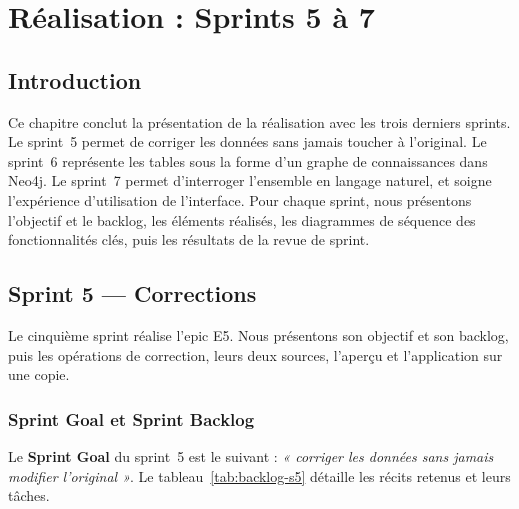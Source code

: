 \chapter{Réalisation : Sprints 5 à 7}

\section*{Introduction}
Ce chapitre conclut la présentation de la réalisation avec les trois derniers sprints. Le sprint~5 permet de corriger les données sans jamais toucher à l'original. Le sprint~6 représente les tables sous la forme d'un graphe de connaissances dans Neo4j. Le sprint~7 permet d'interroger l'ensemble en langage naturel, et soigne l'expérience d'utilisation de l'interface. Pour chaque sprint, nous présentons l'objectif et le backlog, les éléments réalisés, les diagrammes de séquence des fonctionnalités clés, puis les résultats de la revue de sprint.

\section{Sprint 5 — Corrections}

Le cinquième sprint réalise l'epic E5. Nous présentons son objectif et son backlog, puis les opérations de correction, leurs deux sources, l'aperçu et l'application sur une copie.

\subsection{Sprint Goal et Sprint Backlog}

Le \textbf{Sprint Goal} du sprint~5 est le suivant : \textit{« corriger les données sans jamais modifier l'original »}. Le tableau~\ref{tab:backlog-s5} détaille les récits retenus et leurs tâches.

